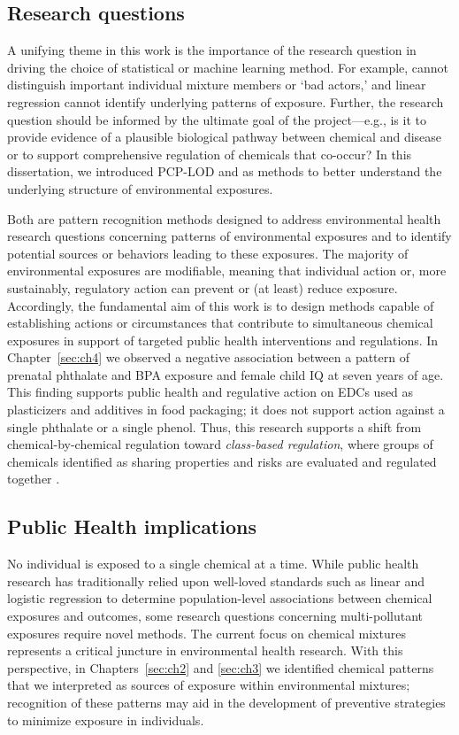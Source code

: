 \subsection{Research questions}\label{sec:question}
A unifying theme in this work is the importance of the research question in driving the choice of statistical or machine learning method. For example, \bnmf cannot distinguish important individual mixture members or `bad actors,' and linear regression cannot identify underlying patterns of exposure. Further, the research question should be informed by the ultimate goal of the project---e.g., is it to provide evidence of a plausible biological pathway between chemical and disease or to support comprehensive regulation of chemicals that co-occur? In this dissertation, we introduced PCP-LOD and \bnmf as methods to better understand the underlying structure of environmental exposures.

Both are pattern recognition methods designed to address environmental health research questions concerning patterns of environmental exposures and to identify potential sources or behaviors leading to these exposures. The majority of environmental exposures are modifiable, meaning that individual action or, more sustainably, regulatory action can prevent or (at least) reduce exposure. Accordingly, the fundamental aim of this work is to design methods capable of establishing actions or circumstances that contribute to simultaneous chemical exposures in support of targeted public health interventions and regulations. In Chapter~\ref{sec:ch4} we observed a negative association between a pattern of prenatal phthalate and BPA exposure and female child IQ at seven years of age. This finding supports public health and regulative action on EDCs used as plasticizers and additives in food packaging; it does not support action against a single phthalate or a single phenol. Thus, this research supports a shift from chemical-by-chemical regulation toward \textit{class-based regulation}, where groups of chemicals identified as sharing properties and risks are evaluated and regulated together \citep{cordner2016can}.

\subsection{Public Health implications}\label{sec:fin}
No individual is exposed to a single chemical at a time. While public health research has traditionally relied upon well-loved standards such as linear and logistic regression to determine population-level associations between chemical exposures and outcomes, some research questions concerning multi-pollutant exposures require novel methods. The current focus on chemical mixtures represents a critical juncture in environmental health research. With this perspective, in Chapters~\ref{sec:ch2} and \ref{sec:ch3} we identified chemical patterns that we interpreted as sources of exposure within environmental mixtures; recognition of these patterns may aid in the development of preventive strategies to minimize exposure in individuals.

